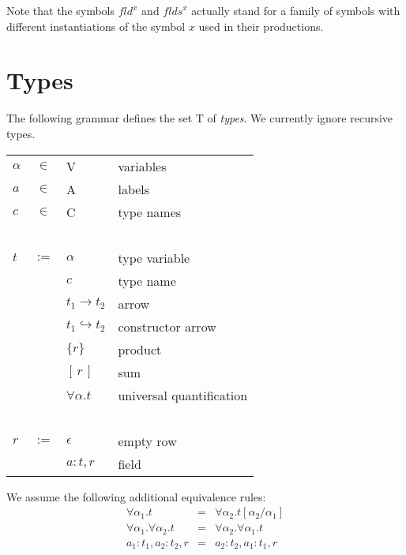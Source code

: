 \documentclass[twoside]{article}
\newcommand{\conarrow}{\hookrightarrow}
\newcommand{\x}[1]{\mathit{#1}}
\newcommand{\f}[1]{\mbox{#1}}
\newcommand{\fld}{\x{fld}}
\newcommand{\flds}{\x{flds}}
\begin{document}
Note that the symbols $\fld^x$ and $\flds^x$ actually stand for a family of symbols with different instantiations of the symbol $x$ used in their productions.


\section{Types}
\label{types}

The following grammar defines the set $\f{T}$ of {\em types}. We currently ignore recursive types.

\begin{center}
\begin{tabular}{lcll}
$\alpha$&$\in$&	\f{V}				& variables \\
$a$	&$\in$&	\f{A}				& labels \\
$c$	&$\in$&	\f{C}				& type names \\
\ \\

$t$	&$:=$&	$\alpha$			& type variable \\
	&&	$c$				& type name \\
	&&	$t_1 \to t_2$			& arrow \\
	&&	$t_1 \conarrow t_2$		& constructor arrow \\
	&&	$\{r\}$				& product \\
	&&	$[\,r\,]$			& sum \\
	&&	$\forall \alpha . t$		& universal quantification \\
\ \\

$r$	&$:=$&	$\epsilon$			& empty row \\
	&&	$a:t,r$				& field \\
%
\end{tabular}
\end{center}

We assume the following additional equivalence rules:
\begin{eqnarray*}
\forall \alpha_1.t &=& \forall \alpha_2.t[\alpha_2/\alpha_1] \\
\forall \alpha_1.\forall \alpha_2.t &=& \forall \alpha_2.\forall \alpha_1.t \\
a_1:t_1,a_2:t_2,r &=& a_2:t_2,a_1:t_1,r
\end{eqnarray*}
\end{document}
